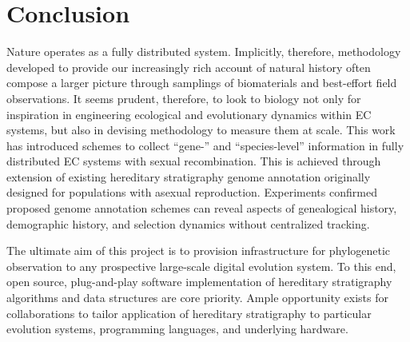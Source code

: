 \section{Conclusion} \label{sec:conclusion}

Nature operates as a fully distributed system.
Implicitly, therefore, methodology developed to provide our increasingly rich account of natural history often compose a larger picture through samplings of biomaterials and best-effort field observations.
It seems prudent, therefore, to look to biology not only for inspiration in engineering ecological and evolutionary dynamics within EC systems, but also in devising methodology to measure them at scale.
This work has introduced schemes to collect ``gene-'' and ``species-level'' information in fully distributed EC systems with sexual recombination.
This is achieved through extension of existing hereditary stratigraphy genome annotation originally designed for populations with asexual reproduction.
Experiments confirmed proposed genome annotation schemes can reveal aspects of genealogical history, demographic history, and selection dynamics without centralized tracking.

The ultimate aim of this project is to provision infrastructure for phylogenetic observation to any prospective large-scale digital evolution system.
To this end, open source, plug-and-play software implementation of hereditary stratigraphy algorithms and data structures are core priority.
Ample opportunity exists for collaborations to tailor application of hereditary stratigraphy to particular evolution systems, programming languages, and underlying hardware.
